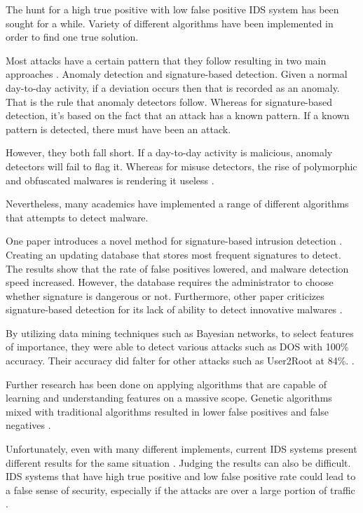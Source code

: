 \documentclass[11pt]{article}
\begin{document}
The hunt for a high true positive with low false positive IDS system has been sought for a while. Variety of different algorithms have been implemented in order to find one true solution. 

Most attacks have a certain pattern that they follow resulting in two main approaches \cite{related-work-main-approaches}. Anomaly detection and signature-based detection. Given a normal day-to-day activity, if a deviation occurs then that is recorded as an anomaly. That is the rule that anomaly detectors follow. Whereas for signature-based detection, it’s based on the fact that an attack has a known pattern. If a known pattern is detected, there must have been an attack.

However, they both fall short. If a day-to-day activity is malicious, anomaly detectors will fail to flag it. Whereas for misuse detectors, the rise of polymorphic and obfuscated malwares is rendering it useless \cite{related-work-main-approaches}.

Nevertheless, many academics have implemented a range of different algorithms that attempts to detect malware. 

One paper introduces a novel method for signature-based intrusion detection \cite{related-work-signature-based}. Creating an updating database that stores most frequent signatures to detect. The results show that the rate of false positives lowered, and malware detection speed increased. However, the database requires the administrator to choose whether signature is dangerous or not. Furthermore, other paper criticizes signature-based detection for its lack of ability to detect innovative malwares \cite{related-work-criticise-signature}. 
 
By utilizing data mining techniques such as Bayesian networks, to select features of importance, they were able to detect various attacks such as DOS with 100\% accuracy. Their accuracy did falter for other attacks such as User2Root at 84\%. \cite{related-work-main-approaches}.

Further research has been done on applying algorithms that are capable of learning and understanding features on a massive scope. Genetic algorithms mixed with traditional algorithms resulted in lower false positives and false negatives \cite{related-work-criticise-signature}. 

Unfortunately, even with many different implements, current IDS systems present different results for the same situation \cite{related-work-advantages-and-disadvantages}. Judging the results can also be difficult. IDS systems that have high true positive and low false positive rate could lead to a false sense of security, especially if the attacks are over a large portion of traffic \cite{related-work-advantages-and-disadvantages}.
\end{document}
